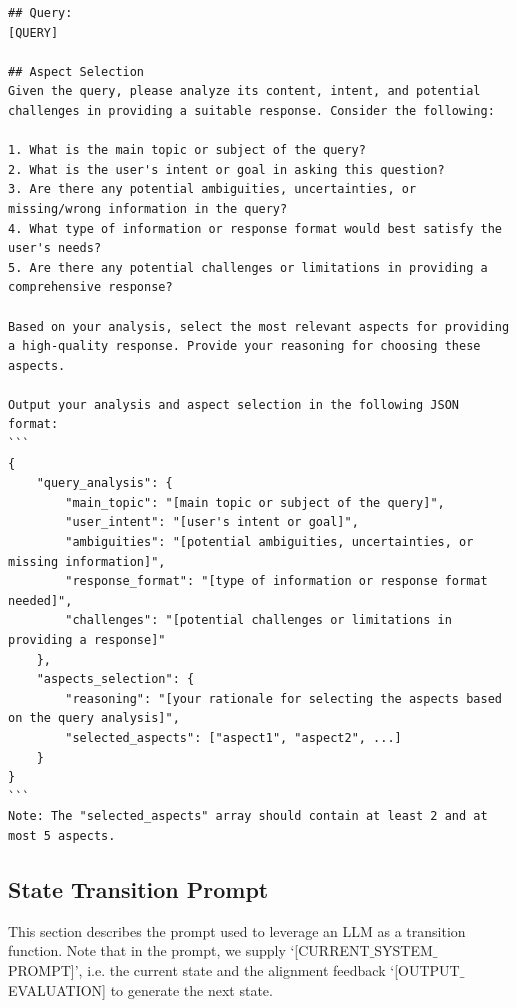 \begin{lstlisting}[breaklines=true,breakatwhitespace=true]
## Query: 
[QUERY]

## Aspect Selection
Given the query, please analyze its content, intent, and potential challenges in providing a suitable response. Consider the following:

1. What is the main topic or subject of the query?
2. What is the user's intent or goal in asking this question?
3. Are there any potential ambiguities, uncertainties, or missing/wrong information in the query?
4. What type of information or response format would best satisfy the user's needs?
5. Are there any potential challenges or limitations in providing a comprehensive response?

Based on your analysis, select the most relevant aspects for providing a high-quality response. Provide your reasoning for choosing these aspects.

Output your analysis and aspect selection in the following JSON format:
```
{
    "query_analysis": {
        "main_topic": "[main topic or subject of the query]",
        "user_intent": "[user's intent or goal]",
        "ambiguities": "[potential ambiguities, uncertainties, or missing information]",
        "response_format": "[type of information or response format needed]",
        "challenges": "[potential challenges or limitations in providing a response]"
    },
    "aspects_selection": {
        "reasoning": "[your rationale for selecting the aspects based on the query analysis]",
        "selected_aspects": ["aspect1", "aspect2", ...]
    }
}
```
Note: The "selected_aspects" array should contain at least 2 and at most 5 aspects.
\end{lstlisting}






\subsection{State Transition Prompt}

This section describes the prompt used to leverage an LLM as a transition function. Note that in the prompt, we supply `[CURRENT$\_$SYSTEM$\_$PROMPT]', i.e. the current state and the alignment feedback `[OUTPUT$\_$EVALUATION] to generate the next state.

